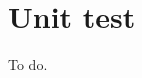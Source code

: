 \documentclass[11pt]{article}
\begin{document}
\begin{comment}
The Wigner 3‐j symbol has 



Our aim is to compute
$${}_3F_2(\{1,r+y +1,\beta +y +1\}; \{y +2,r+\alpha +\beta +y +1\};1),$$
where $(y +2 + r+\alpha +\beta +y +1)-(1+r+y +1+\beta +y +1)=\alpha>0$ and $z=1$. Meet the conditions.

\end{comment}

\section{Unit test}
To do.







\clearpage

 






\end{document}
